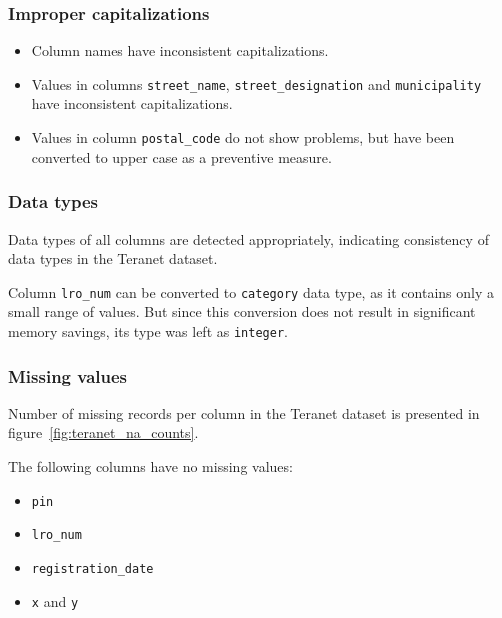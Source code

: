 \documentclass[11pt]{article}
\begin{document}
    \subsubsection{Improper capitalizations} \label{subsubsec:teranet_capitalizations}

    \begin{itemize}
        \item Column names have inconsistent capitalizations.
        \item Values in columns \texttt{street\_name}, \texttt{street\_designation} and \texttt{municipality} have inconsistent capitalizations.
        \item Values in column \texttt{postal\_code} do not show problems, but have been converted to upper case as a preventive measure.
    \end{itemize}

    \subsubsection{Data types} \label{subsubsec:teranet_data_types}

    Data types of all columns are detected appropriately, indicating consistency of data types in the Teranet dataset.

    Column \texttt{lro\_num} can be converted to \texttt{category} data type, as it contains only a small range of values.
    But since this conversion does not result in significant memory savings, its type was left as \texttt{integer}.

    \subsubsection{Missing values} \label{subsubsec:teranet_missing_values}

    Number of missing records per column in the Teranet dataset is presented in figure~\ref{fig:teranet_na_counts}.

    \vspace{5mm}

    The following columns have no missing values:

    \begin{itemize}
        \item \texttt{pin}
        \item \texttt{lro\_num}
        \item \texttt{registration\_date}
        \item \texttt{x} and \texttt{y}
    \end{itemize}
\end{document}
